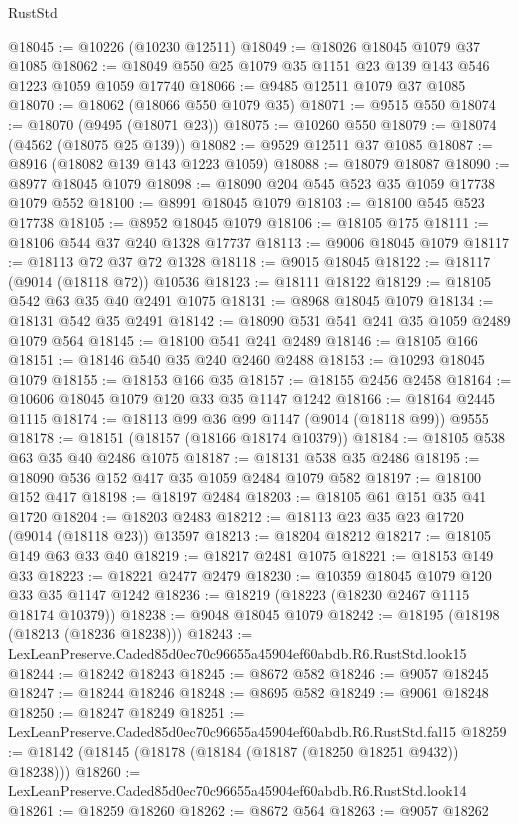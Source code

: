 \begin{lexlean}{RustStd}
\begin{coremodule}
@18045 := @10226 (@10230 @12511)
@18049 := @18026 @18045 @1079 @37 @1085
@18062 := @18049 @550 @25 @1079 @35 @1151 @23 @139 @143 @546 @1223 @1059 @1059 @17740
@18066 := @9485 @12511 @1079 @37 @1085
@18070 := @18062 (@18066 @550 @1079 @35)
@18071 := @9515 @550
@18074 := @18070 (@9495 (@18071 @23))
@18075 := @10260 @550
@18079 := @18074 (@4562 (@18075 @25 @139))
@18082 := @9529 @12511 @37 @1085
@18087 := @8916 (@18082 @139 @143 @1223 @1059)
@18088 := @18079 @18087
@18090 := @8977 @18045 @1079
@18098 := @18090 @204 @545 @523 @35 @1059 @17738 @1079 @552
@18100 := @8991 @18045 @1079
@18103 := @18100 @545 @523 @17738
@18105 := @8952 @18045 @1079
@18106 := @18105 @175
@18111 := @18106 @544 @37 @240 @1328 @17737
@18113 := @9006 @18045 @1079
@18117 := @18113 @72 @37 @72 @1328
@18118 := @9015 @18045
@18122 := @18117 (@9014 (@18118 @72)) @10536
@18123 := @18111 @18122
@18129 := @18105 @542 @63 @35 @40 @2491 @1075
@18131 := @8968 @18045 @1079
@18134 := @18131 @542 @35 @2491
@18142 := @18090 @531 @541 @241 @35 @1059 @2489 @1079 @564
@18145 := @18100 @541 @241 @2489
@18146 := @18105 @166
@18151 := @18146 @540 @35 @240 @2460 @2488
@18153 := @10293 @18045 @1079
@18155 := @18153 @166 @35
@18157 := @18155 @2456 @2458
@18164 := @10606 @18045 @1079 @120 @33 @35 @1147 @1242
@18166 := @18164 @2445 @1115
@18174 := @18113 @99 @36 @99 @1147 (@9014 (@18118 @99)) @9555
@18178 := @18151 (@18157 (@18166 @18174 @10379))
@18184 := @18105 @538 @63 @35 @40 @2486 @1075
@18187 := @18131 @538 @35 @2486
@18195 := @18090 @536 @152 @417 @35 @1059 @2484 @1079 @582
@18197 := @18100 @152 @417
@18198 := @18197 @2484
@18203 := @18105 @61 @151 @35 @41 @1720
@18204 := @18203 @2483
@18212 := @18113 @23 @35 @23 @1720 (@9014 (@18118 @23)) @13597
@18213 := @18204 @18212
@18217 := @18105 @149 @63 @33 @40
@18219 := @18217 @2481 @1075
@18221 := @18153 @149 @33
@18223 := @18221 @2477 @2479
@18230 := @10359 @18045 @1079 @120 @33 @35 @1147 @1242
@18236 := @18219 (@18223 (@18230 @2467 @1115 @18174 @10379))
@18238 := @9048 @18045 @1079
@18242 := @18195 (@18198 (@18213 (@18236 @18238)))
@18243 := LexLeanPreserve.Caded85d0ec70c96655a45904ef60abdb.R6.RustStd.look15
@18244 := @18242 @18243
@18245 := @8672 @582
@18246 := @9057 @18245
@18247 := @18244 @18246
@18248 := @8695 @582
@18249 := @9061 @18248
@18250 := @18247 @18249
@18251 := LexLeanPreserve.Caded85d0ec70c96655a45904ef60abdb.R6.RustStd.fal15
@18259 := @18142 (@18145 (@18178 (@18184 (@18187 (@18250 @18251 @9432)) @18238)))
@18260 := LexLeanPreserve.Caded85d0ec70c96655a45904ef60abdb.R6.RustStd.look14
@18261 := @18259 @18260
@18262 := @8672 @564
@18263 := @9057 @18262

\end{coremodule}
\end{lexlean}
